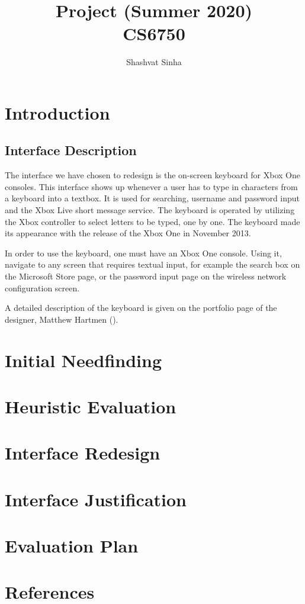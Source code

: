 \documentclass[
	letterpaper, %
]{jdf}
\author{Shashvat Sinha}
\title{Project (Summer 2020)\\CS6750}
\begin{document}

\maketitle

\section{Introduction}
\subsection{Interface Description}
The interface we have chosen to redesign is the on-screen keyboard for Xbox One consoles. This interface shows up whenever a user has to type in characters from a keyboard into a textbox. It is used for searching, username and password input and the Xbox Live short message service. The keyboard is operated by utilizing the Xbox controller to select letters to be typed, one by one. The keyboard made its appearance with the release of the Xbox One in November 2013.

In order to use the keyboard, one must have an Xbox One console. Using it, navigate to any screen that requires textual input, for example the search box on the Microsoft Store page, or the password input page on the wireless network configuration screen.

A detailed description of the keyboard is given on the portfolio page of the designer, Matthew Hartmen (\cite{hartman_2013}).



\section{Initial Needfinding}


\section{Heuristic Evaluation}

\section{Interface Redesign}

\section{Interface Justification}

\section{Evaluation Plan}


\section{References}

\printbibliography[heading=none]
\end{document}
